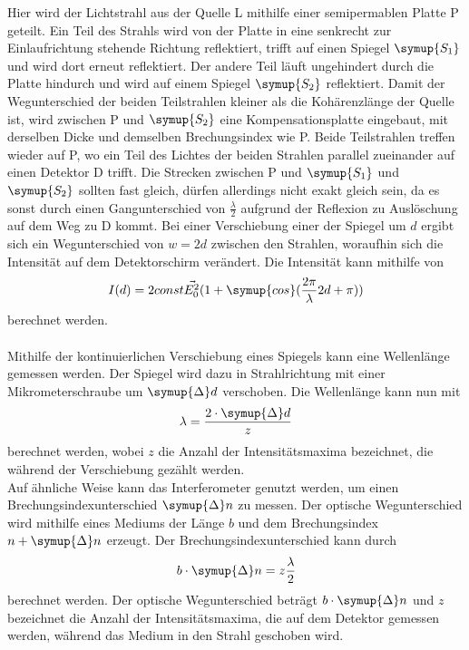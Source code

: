     Hier wird der Lichtstrahl aus der Quelle L mithilfe einer semipermablen Platte P geteilt.
    Ein Teil des Strahls wird von der Platte in eine senkrecht zur Einlaufrichtung stehende Richtung reflektiert,
    trifft auf einen Spiegel $\symup{S_1}$ und wird dort erneut reflektiert.
    Der andere Teil läuft ungehindert durch die Platte hindurch und wird auf einem Spiegel $\symup{S_2}$ reflektiert.
    Damit der Wegunterschied der beiden Teilstrahlen kleiner als die Kohärenzlänge der Quelle ist,
    wird zwischen P und $\symup{S_2}$ eine Kompensationsplatte eingebaut,
    mit derselben Dicke und demselben Brechungsindex wie P.
    Beide Teilstrahlen treffen wieder auf P,
    wo ein Teil des Lichtes der beiden Strahlen parallel zueinander auf einen Detektor D trifft. 
    Die Strecken zwischen P und $\symup{S_1}$ und $\symup{S_2}$ sollten fast gleich, 
    dürfen allerdings nicht exakt gleich sein,
    da es sonst durch einen Gangunterschied von $\frac{\lambda}{2}$ aufgrund der Reflexion zu Auslöschung auf dem Weg zu D kommt.
    Bei einer Verschiebung einer der Spiegel um $d$ ergibt sich ein Wegunterschied von $w = 2d$ zwischen den Strahlen,
    woraufhin sich die Intensität auf dem Detektorschirm verändert.
    Die Intensität kann mithilfe von
    \begin{equation}
        I(d) = 2 const \vec{E_0^2} (1 + \symup{cos}(\frac{2\pi}{\lambda} 2d + \pi))
    \end{equation}
    berechnet werden.\\
    \\
    Mithilfe der kontinuierlichen Verschiebung eines Spiegels kann eine Wellenlänge gemessen werden.
    Der Spiegel wird dazu in Strahlrichtung mit einer Mikrometerschraube um $\symup{\Delta}d$ verschoben.
    Die Wellenlänge kann nun mit
    \begin{equation}
        \lambda = \frac{2 \cdot \symup{\Delta}d}{z} \label{eqn:Wellenlänge}
    \end{equation}
    berechnet werden,
    wobei $z$ die Anzahl der Intensitätsmaxima bezeichnet,
    die während der Verschiebung gezählt werden.\\
    Auf ähnliche Weise kann das Interferometer genutzt werden,
    um einen Brechungsindexunterschied $\symup{\Delta}n$ zu messen.
    Der optische Wegunterschied wird mithilfe eines Mediums der Länge $b$ und dem Brechungsindex $n + \symup{\Delta}n$ erzeugt.
    Der Brechungsindexunterschied kann durch
    \begin{equation}
        b \cdot \symup{\Delta}n = z \frac{\lambda}{2} \label{eqn:Brechungsindex}
    \end{equation}
    berechnet werden. 
    Der optische Wegunterschied beträgt $b \cdot \symup{\Delta}n$ und $z$ bezeichnet die Anzahl der Intensitätsmaxima,
    die auf dem Detektor gemessen werden,
    während das Medium in den Strahl geschoben wird.

